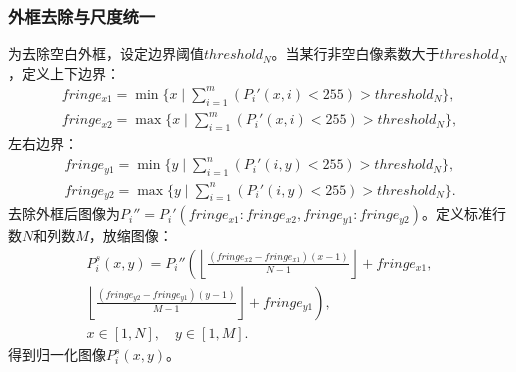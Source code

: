\documentclass{whutmod}
\begin{document}
				\subsubsection{外框去除与尺度统一}
				为去除空白外框，设定边界阈值$threshold_N$。当某行非空白像素数大于$threshold_N$，定义上下边界：
				\begin{gather*}
					fringe_{x1} = \min \{ x \mid \sum_{i=1}^{m} (P_i'(x,i) < 255) > threshold_N \}, \\
					fringe_{x2} = \max \{ x \mid \sum_{i=1}^{m} (P_i'(x,i) < 255) > threshold_N \},
				\end{gather*}
				左右边界：
				\begin{gather*}
					fringe_{y1} = \min \{ y \mid \sum_{i=1}^{n} (P_i'(i,y) < 255) > threshold_N \}, \\
					fringe_{y2} = \max \{ y \mid \sum_{i=1}^{n} (P_i'(i,y) < 255) > threshold_N \}.
				\end{gather*}
				去除外框后图像为$P_i'' = P_i'(fringe_{x1}:fringe_{x2}, fringe_{y1}:fringe_{y2})$。定义标准行数$N$和列数$M$，放缩图像：
				\begin{gather*}
					P_i^s(x,y) = P_i''\left( \left\lfloor \frac{(fringe_{x2} - fringe_{x1})(x-1)}{N-1} \right\rfloor + fringe_{x1}, \right. \\
					\left. \left\lfloor \frac{(fringe_{y2} - fringe_{y1})(y-1)}{M-1} \right\rfloor + fringe_{y1} \right), \\
					x \in [1,N], \quad y \in [1,M].
				\end{gather*}
				得到归一化图像$P_i^s(x,y)$。
\end{document}
